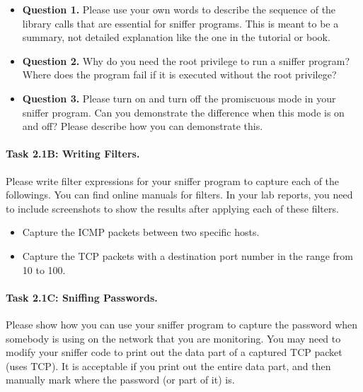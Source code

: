 \begin{itemize}
\item \textbf{Question 1.} Please use your own words to describe the sequence of the 
library calls that are essential for sniffer programs. This 
is meant to be a summary, not detailed explanation like the 
one in the tutorial or book.
 
\item \textbf{Question 2.} Why do you need the root privilege to run a sniffer program? Where
does the program fail if it is executed without the root privilege?


\item \textbf{Question 3.} Please turn on and turn off the promiscuous mode in your sniffer
program. Can you demonstrate the difference when this mode is on and off? Please describe how
you can demonstrate this.
\end{itemize}


\paragraph{Task 2.1B: Writing Filters.}
Please write filter expressions for your sniffer program 
to capture each of the followings. You can find online 
manuals for \pcap filters.
In your lab reports, you need to include screenshots to show
the results after applying each of these filters. 
\begin{itemize}
\item Capture the ICMP packets between two specific hosts.
\item Capture the TCP packets with a destination port number 
      in the range from 10 to 100.  
\end{itemize}



\paragraph{Task 2.1C: Sniffing Passwords.}
Please show how you can use your sniffer program to capture the 
password when somebody is using \telnet on the 
network that you are monitoring. You may need to modify
your sniffer code to print out the data part of a captured TCP 
packet (\telnet uses TCP). It is acceptable if you print out the entire data part, and then
manually mark where the password (or part of it) is.




